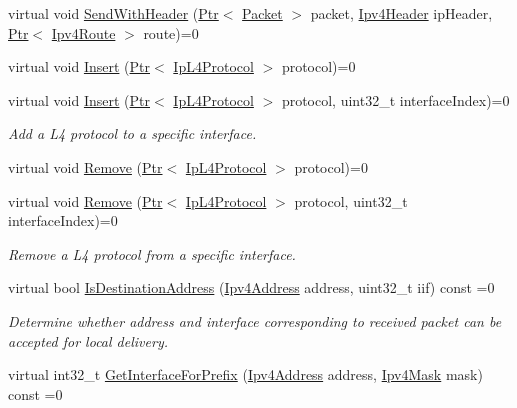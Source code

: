 \begin{DoxyCompactItemize}
\item 
virtual void \hyperlink{classns3_1_1Ipv4_a6d6b3f031557d3fccc195df342f8598a}{Send\+With\+Header} (\hyperlink{classns3_1_1Ptr}{Ptr}$<$ \hyperlink{classns3_1_1Packet}{Packet} $>$ packet, \hyperlink{classns3_1_1Ipv4Header}{Ipv4\+Header} ip\+Header, \hyperlink{classns3_1_1Ptr}{Ptr}$<$ \hyperlink{classns3_1_1Ipv4Route}{Ipv4\+Route} $>$ route)=0
\item 
virtual void \hyperlink{classns3_1_1Ipv4_a4a3a2344ac44ff2126feb034f172671d}{Insert} (\hyperlink{classns3_1_1Ptr}{Ptr}$<$ \hyperlink{classns3_1_1IpL4Protocol}{Ip\+L4\+Protocol} $>$ protocol)=0
\item 
virtual void \hyperlink{classns3_1_1Ipv4_a8bfa5664c5dfd59f7e12e4cd59f28f00}{Insert} (\hyperlink{classns3_1_1Ptr}{Ptr}$<$ \hyperlink{classns3_1_1IpL4Protocol}{Ip\+L4\+Protocol} $>$ protocol, uint32\+\_\+t interface\+Index)=0
\begin{DoxyCompactList}\small\item\em Add a L4 protocol to a specific interface. \end{DoxyCompactList}\item 
virtual void \hyperlink{classns3_1_1Ipv4_a53bdb693f9688a3cf51ef8c9d290fdd1}{Remove} (\hyperlink{classns3_1_1Ptr}{Ptr}$<$ \hyperlink{classns3_1_1IpL4Protocol}{Ip\+L4\+Protocol} $>$ protocol)=0
\item 
virtual void \hyperlink{classns3_1_1Ipv4_ae9b1e38c3c9461ab1344eb1dc8444f63}{Remove} (\hyperlink{classns3_1_1Ptr}{Ptr}$<$ \hyperlink{classns3_1_1IpL4Protocol}{Ip\+L4\+Protocol} $>$ protocol, uint32\+\_\+t interface\+Index)=0
\begin{DoxyCompactList}\small\item\em Remove a L4 protocol from a specific interface. \end{DoxyCompactList}\item 
virtual bool \hyperlink{classns3_1_1Ipv4_a82691b73bb7f96ca9932f5545b3d4d9c}{Is\+Destination\+Address} (\hyperlink{classns3_1_1Ipv4Address}{Ipv4\+Address} address, uint32\+\_\+t iif) const =0
\begin{DoxyCompactList}\small\item\em Determine whether address and interface corresponding to received packet can be accepted for local delivery. \end{DoxyCompactList}\item 
virtual int32\+\_\+t \hyperlink{classns3_1_1Ipv4_ac0ac95059f33e44ba2e848749489682b}{Get\+Interface\+For\+Prefix} (\hyperlink{classns3_1_1Ipv4Address}{Ipv4\+Address} address, \hyperlink{classns3_1_1Ipv4Mask}{Ipv4\+Mask} mask) const =0

\end{DoxyCompactItemize}

